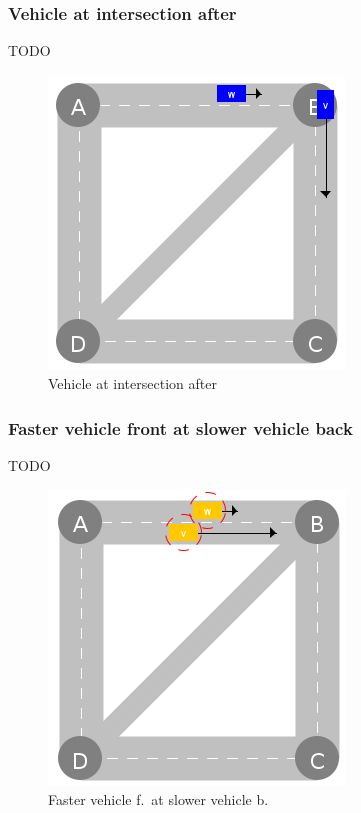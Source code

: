 \documentclass{IEEEtran}
\begin{document}
    \subsubsection{Vehicle at intersection after}
    TODO

    \begin{figure}[htbp]
        \centering
        \includegraphics[scale=0.5]{../../events/vehicle-at-intersection-after.png}
        \caption{Vehicle at intersection after}
        \label{fig:vehicle-at-intersection-after}
    \end{figure}

    \subsubsection{Faster vehicle front at slower vehicle back}
    TODO

    \begin{figure}[htbp]
        \centering
        \includegraphics[scale=0.5]{../../events/faster-vehicle-front-at-slower-vehicle-back.png}
        \caption{Faster vehicle f.\ at slower vehicle b.}
        \label{fig:faster-vehicle-front-at-slower-vehicle-back}
    \end{figure}
\end{document}
